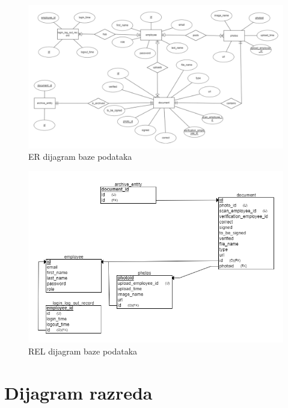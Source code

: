 				\begin{figure}[H]
					\includegraphics[scale=0.6]{slike/kompletici_v4_ER.PNG} %
					\centering
					\caption{ER dijagram baze podataka}
					\label{fig:promjene}
				\end{figure}
				
					\begin{figure}[H]
					\includegraphics[scale=0.5]{slike/kompletici_v4_REL.PNG} %
					\centering
					\caption{REL dijagram baze podataka}
					\label{fig:promjene}
				\end{figure}
				
				
			
			\eject
			
			
		\section{Dijagram razreda}

